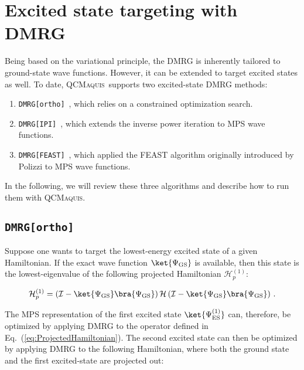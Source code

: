 \documentclass[bibliography=totoc,12pt,a4paper]{scrartcl}
\newcommand{\qcm}{\textsc{QCMaquis}}
\begin{document}
\section{Excited state targeting with DMRG}

Being based on the variational principle, the DMRG is inherently tailored to ground-state wave functions.
However, it can be extended to target excited states as well.
To date, \qcm\ supports two excited-state DMRG methods:

\begin{enumerate}
  \item \texttt{DMRG[ortho]}~\cite{Keller_JChemPhys_efficient_2015}, which relies on a constrained optimization search.
  \item \texttt{DMRG[IPI]}~\cite{Baiardi2022_DMRG-FEAST}, which extends the inverse power iteration to MPS wave functions.
  \item \texttt{DMRG[FEAST]}~\cite{Baiardi2022_DMRG-FEAST}, which applied the FEAST algorithm originally introduced by Polizzi\cite{Polizzi2009_FEAST} to MPS wave functions.
\end{enumerate}

\noindent In the following, we will review these three algorithms and describe how to run them with \qcm.

\subsection{\texttt{DMRG[ortho]}}

\noindent Suppose one wants to target the lowest-energy excited state of a given Hamiltonian.
If the exact wave function $\ket{\Psi_\text{GS}}$ is available, then this state is the lowest-eigenvalue of the following projected Hamiltonian $\mathcal{H}_p^{(1)}$:

\begin{equation}
  \mathcal{H}_p^{(1)} = \left( \mathcal{I} - \ket{\Psi_\text{GS}} \bra{\Psi_\text{GS}} \right)
  				  		\mathcal{H}
				  		\left( \mathcal{I} - \ket{\Psi_\text{GS}} \bra{\Psi_\text{GS}} \right) \, .
  \label{eq:ProjectedHamiltonian}
\end{equation}

\noindent The MPS representation of the first excited state $\ket{\Psi_\text{ES}^{(1)}}$ can, therefore, be optimized by applying DMRG to the operator defined in Eq.~(\ref{eq:ProjectedHamiltonian}).
The second excited state can then be optimized by applying DMRG to the following Hamiltonian, where both the ground state and the first excited-state are projected out:
\end{document}
